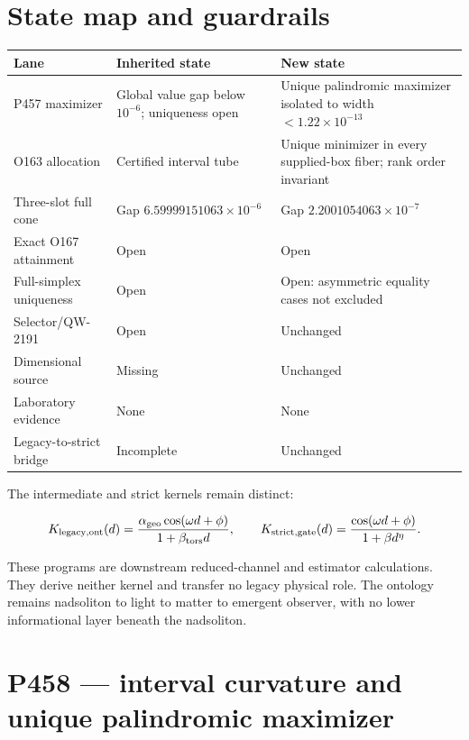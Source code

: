 \documentclass[11pt,a4paper,openany]{report}
\begin{document}
\chapter{State map and guardrails}

\begin{center}
\begingroup\small
\setlength{\tabcolsep}{2.5pt}
\renewcommand{\arraystretch}{1.16}
\begin{longtable}{@{}p{}p{}p{}@{}}
\toprule
\textbf{Lane} & \textbf{Inherited state} & \textbf{New state} \\
\midrule
\endhead
P457 maximizer & Global value gap below \(10^{-6}\); uniqueness open & Unique palindromic maximizer isolated to width \(<1.22\times10^{-13}\) \\
O163 allocation & Certified interval tube & Unique minimizer in every supplied-box fiber; rank order invariant \\
Three-slot full cone & Gap \(6.59999151063\times10^{-6}\) & Gap \(2.2001054063\times10^{-7}\) \\
Exact O167 attainment & Open & Open \\
Full-simplex uniqueness & Open & Open: asymmetric equality cases not excluded \\
Selector/\allowbreak{}QW-2191 & Open & Unchanged \\
Dimensional source & Missing & Unchanged \\
Laboratory evidence & None & None \\
Legacy-to-strict bridge & Incomplete & Unchanged \\
\bottomrule
\end{longtable}
\endgroup
\end{center}

The intermediate and strict kernels remain distinct:

\[
K_{\rm legacy,ont}(d)=
\frac{\alpha_{\rm geo}\cos(\omega d+\phi)}{1+\beta_{\rm tors}d},
\qquad
K_{\rm strict,gate}(d)=
\frac{\cos(\omega d+\phi)}{1+\beta d^\eta}.
\]

These programs are downstream reduced-channel and estimator calculations. They derive neither kernel and transfer no legacy physical role. The ontology remains nadsoliton to light to matter to emergent observer, with no lower informational layer beneath the nadsoliton.

\chapter{P458 --- interval curvature and unique palindromic maximizer}
\end{document}
